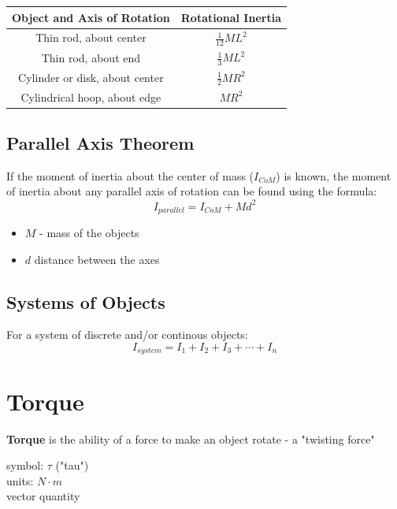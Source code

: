 \documentclass[titlepage]{article}
\begin{document}
\begin{table}[H]
    \centering
    \makegapedcells

    \begin{tabular}{c|c}
        \textbf{Object and Axis of Rotation} & \textbf{Rotational Inertia} \\
        \hline
        Thin rod, about center               & $\frac{1}{12}ML^2$          \\
        Thin rod, about end                  & $\frac{1}{3}ML^2$           \\
        Cylinder or disk, about center       & $\frac{1}{2} MR^2$          \\
        Cylindrical hoop, about edge         & $MR^2$
    \end{tabular}
\end{table}

\subsection{Parallel Axis Theorem}
If the moment of inertia about the center of mass ($I_{CoM}$) is known, the moment of inertia about any parallel axis of rotation can be found using the formula:
\begin{equation*}
    I_{parallel} = I_{CoM} + Md^2
\end{equation*}

\begin{itemize}
    \item $M$ - mass of the objects
    \item $d$ distance between the axes
\end{itemize}

\subsection{Systems of Objects}
For a system of discrete and/or continous objects:
\begin{equation*}
    I_{system} = I_1 + I_2 + I_3 + \cdots + I_n
\end{equation*}

\section{Torque}
\textbf{Torque} is the ability of a force to make an object rotate - a "twisting force"

symbol: $\tau$ ("tau") \\
units: $N \cdot m$ \\
vector quantity
\end{document}
